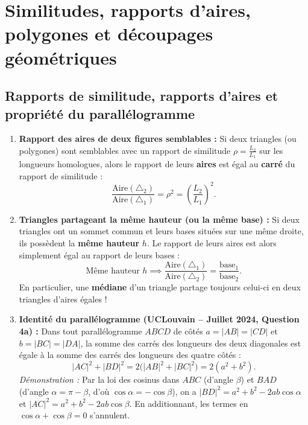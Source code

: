 \section{Similitudes, rapports d'aires, polygones et découpages géométriques}

\subsection{Rapports de similitude, rapports d'aires et propriété du parallélogramme}

\begin{theoreme}
\begin{enumerate}
    \item \textbf{Rapport des aires de deux figures semblables :} Si deux triangles (ou polygones) sont semblables avec un rapport de similitude $\rho = \frac{L_2}{L_1}$ sur les longueurs homologues, alors le rapport de leurs \textbf{aires} est égal au \textbf{carré} du rapport de similitude :
    \[
        \boxed{\frac{\text{Aire}(\triangle_2)}{\text{Aire}(\triangle_1)} = \rho^2 = \left(\frac{L_2}{L_1}\right)^2}.
    \]
    \item \textbf{Triangles partageant la même hauteur (ou la même base) :} Si deux triangles ont un sommet commun et leurs bases situées sur une même droite, ils possèdent la \textbf{même hauteur} $h$. Le rapport de leurs aires est alors simplement égal au rapport de leurs bases :
    \[
        \boxed{\text{Même hauteur } h \implies \frac{\text{Aire}(\triangle_1)}{\text{Aire}(\triangle_2)} = \frac{\text{base}_1}{\text{base}_2}}.
    \]
    En particulier, une \textbf{médiane} d'un triangle partage toujours celui-ci en deux triangles d'aires égales !
    \item \textbf{Identité du parallélogramme (UCLouvain -- Juillet 2024, Question 4a) :} Dans tout parallélogramme $ABCD$ de côtés $a = |AB| = |CD|$ et $b = |BC| = |DA|$, la somme des carrés des longueurs des deux diagonales est égale à la somme des carrés des longueurs des quatre côtés :
    \[
        \boxed{|AC|^2 + |BD|^2 = 2\bigl(|AB|^2 + |BC|^2\bigr) = 2(a^2 + b^2)}.
    \]
    \emph{Démonstration :} Par la loi des cosinus dans $ABC$ (d'angle $\beta$) et $BAD$ (d'angle $\alpha = \pi - \beta$, d'où $\cos\alpha = -\cos\beta$), on a $|BD|^2 = a^2 + b^2 - 2ab\cos\alpha$ et $|AC|^2 = a^2 + b^2 - 2ab\cos\beta$. En additionnant, les termes en $\cos\alpha + \cos\beta = 0$ s'annulent.
\end{enumerate}
\end{theoreme}

